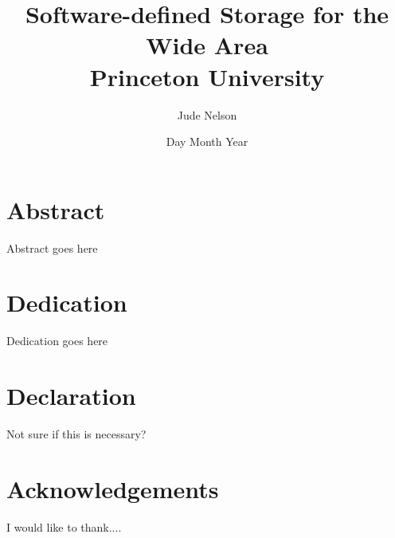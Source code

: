 \documentclass[12pt]{report}
\title{
	{Software-defined Storage for the Wide Area}\\
	{\large Princeton University}\\
}
\author{Jude Nelson}
\date{Day Month Year}
\begin{document}
\maketitle

\chapter*{Abstract}

Abstract goes here

\chapter*{Dedication}

Dedication goes here

\chapter*{Declaration}

Not sure if this is necessary?

\chapter*{Acknowledgements}

I would like to thank....

\tableofcontents










 
\end{document}
